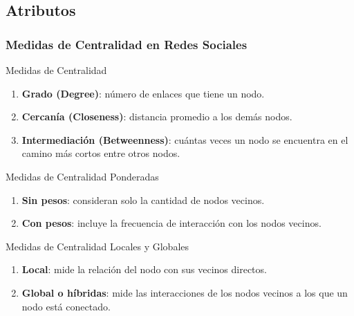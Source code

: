 \documentclass{beamer}
\begin{document}
\subsection{Atributos}

\begin{frame}
	\frametitle{Medidas de Centralidad en Redes Sociales}

\begin{block}{Medidas de Centralidad}
	\begin{enumerate}
	\item \textbf{Grado (Degree)}: número de enlaces que tiene un nodo. 
	
	\item \textbf{Cercanía (Closeness)}: distancia promedio a los demás nodos. 
	
	\item \textbf{Intermediación (Betweenness)}: cuántas veces un nodo se encuentra en el camino más cortos entre otros nodos.
	\end{enumerate}
\end{block}

\begin{block}{Medidas de Centralidad Ponderadas}
	\begin{enumerate}
		\item \textbf{Sin pesos}: consideran solo la cantidad de nodos vecinos.
		\item \textbf{Con pesos}: incluye la frecuencia de interacción con los nodos vecinos.
	\end{enumerate}
\end{block}

\begin{block}{Medidas de Centralidad Locales y Globales}
	\begin{enumerate}
		\item \textbf{Local}: mide la relación del nodo con sus vecinos directos.
		\item \textbf{Global o híbridas}: mide las interacciones de los nodos vecinos a los que un nodo está conectado.
	\end{enumerate}
\end{block}

	
\end{frame}
\end{document}
